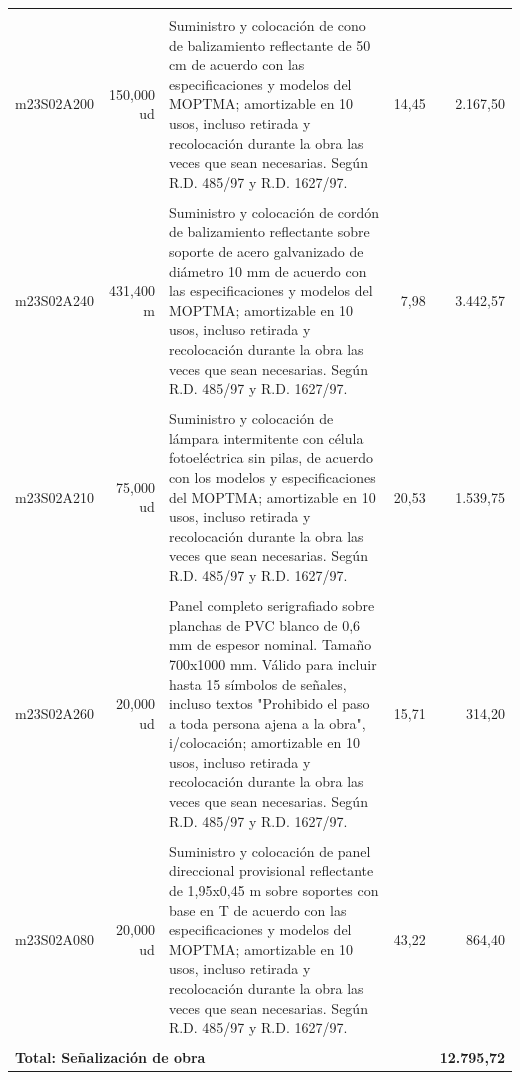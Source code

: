 \documentclass{book}%
\begin{document}
\begin{longtable}{lrlrr}
&&&&\\%
m23S02A200&   150,000 ud&\multicolumn{1}{p{5cm}}{Suministro y colocación de cono de balizamiento reflectante de 50 cm de acuerdo con las especificaciones y modelos del MOPTMA; amortizable en 10 usos, incluso retirada y recolocación durante la obra las veces que sean necesarias. Según R.D. 485/97 y R.D. 1627/97.}&     14,45&2.167,50\\%
&&&&\\%
m23S02A240&   431,400 m&\multicolumn{1}{p{5cm}}{Suministro y colocación de cordón de balizamiento reflectante sobre soporte de acero galvanizado de diámetro 10 mm de acuerdo con las especificaciones y modelos del MOPTMA; amortizable en 10 usos, incluso retirada y recolocación durante la obra las veces que sean necesarias. Según R.D. 485/97 y R.D. 1627/97.}&      7,98&3.442,57\\%
&&&&\\%
m23S02A210&    75,000 ud&\multicolumn{1}{p{5cm}}{Suministro y colocación de lámpara intermitente con célula fotoeléctrica sin pilas, de acuerdo con los modelos y especificaciones del MOPTMA; amortizable en 10 usos, incluso retirada y recolocación durante la obra las veces que sean necesarias. Según R.D. 485/97 y R.D. 1627/97.}&     20,53&1.539,75\\%
&&&&\\%
m23S02A260&    20,000 ud&\multicolumn{1}{p{5cm}}{Panel completo serigrafiado sobre planchas de PVC blanco de 0,6 mm de espesor nominal. Tamaño 700x1000 mm. Válido para incluir hasta 15 símbolos de señales, incluso textos "Prohibido el paso a toda persona ajena a la obra", i/colocación; amortizable en 10 usos, incluso retirada y recolocación durante la obra las veces que sean necesarias. Según R.D. 485/97 y R.D. 1627/97.}&     15,71&314,20\\%
&&&&\\%
m23S02A080&    20,000 ud&\multicolumn{1}{p{5cm}}{Suministro y colocación de panel direccional provisional reflectante de 1,95x0,45 m sobre soportes con base en T de acuerdo con las especificaciones y modelos del MOPTMA; amortizable en 10 usos, incluso retirada y recolocación durante la obra las veces que sean necesarias. Según R.D. 485/97 y R.D. 1627/97.}&     43,22&864,40\\%
&&&&\\%
\multicolumn{4}{p{8cm}}{\textbf{Total: Señalización de obra}}&\textbf{12.795,72}\\%
\end{longtable}%
\normalsize
\end{document}
